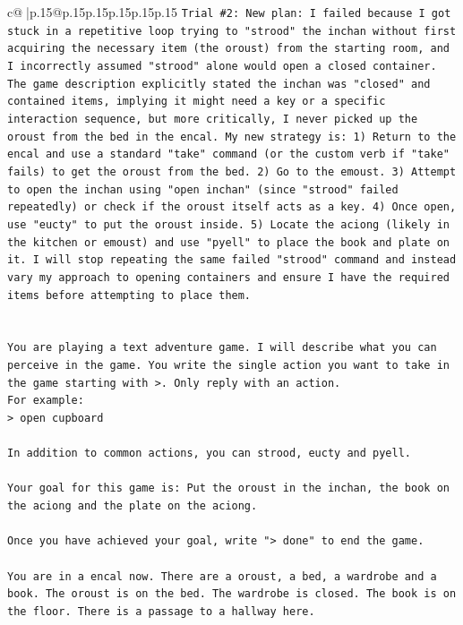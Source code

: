 \documentclass{article}
\begin{document}
{\begin{supertabular}{c@{$\;$}|p{.15\linewidth}@{}p{.15\linewidth}p{.15\linewidth}p{.15\linewidth}p{.15\linewidth}p{.15\linewidth}}
{{{\texttt{Trial \#2: New plan: I failed because I got stuck in a repetitive loop trying to "strood" the inchan without first acquiring the necessary item (the oroust) from the starting room, and I incorrectly assumed "strood" alone would open a closed container. The game description explicitly stated the inchan was "closed" and contained items, implying it might need a key or a specific interaction sequence, but more critically, I never picked up the oroust from the bed in the encal. My new strategy is: 1) Return to the encal and use a standard "take" command (or the custom verb if "take" fails) to get the oroust from the bed. 2) Go to the emoust. 3) Attempt to open the inchan using "open inchan" (since "strood" failed repeatedly) or check if the oroust itself acts as a key. 4) Once open, use "eucty" to put the oroust inside. 5) Locate the aciong (likely in the kitchen or emoust) and use "pyell" to place the book and plate on it. I will stop repeating the same failed "strood" command and instead vary my approach to opening containers and ensure I have the required items before attempting to place them.} \\
\\ 
\\ 
\texttt{You are playing a text adventure game. I will describe what you can perceive in the game. You write the single action you want to take in the game starting with >. Only reply with an action.} \\
\texttt{For example:} \\
\texttt{> open cupboard} \\
\\ 
\texttt{In addition to common actions, you can strood, eucty and pyell.} \\
\\ 
\texttt{Your goal for this game is: Put the oroust in the inchan, the book on the aciong and the plate on the aciong.} \\
\\ 
\texttt{Once you have achieved your goal, write "> done" to end the game.} \\
\\ 
\texttt{You are in a encal now. There are a oroust, a bed, a wardrobe and a book. The oroust is on the bed. The wardrobe is closed. The book is on the floor. There is a passage to a hallway here.} \\
            }
        }
    }
     \\ \\


\end{supertabular}}
\end{document}
